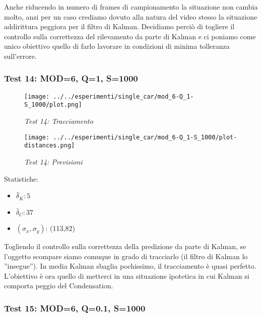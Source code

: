 Anche riducendo in numero di frames di campionamento la situazione non cambia molto, anzi per un caso crediamo dovuto alla natura del video stesso la situazione addirittura peggiora per il filtro di Kalman.
Decidiamo perciò di togliere il controllo sulla correttezza del rilevamento da parte di Kalman e ci poniamo come unico obiettivo quello di farlo lavorare in condizioni di minima tolleranza sull'errore.

\newpage
\subsubsection{Test 14: MOD=6, Q=1, S=1000}

\begin{figure}[hb]
\centering
\texttt{[image: ../../esperimenti/single\_car/mod\_6-Q\_1-S\_1000/plot.png]}
\caption{\textit{Test 14: Tracciamento}}
\end{figure}

\begin{figure}[hb]
\centering
\texttt{[image: ../../esperimenti/single\_car/mod\_6-Q\_1-S\_1000/plot-distances.png]}
\caption{\textit{Test 14: Previsioni}}
\end{figure}

Statistiche:
\begin{itemize}
\item \begin{math} \bar \delta_K: 5 \end{math}
\item \begin{math} \bar \delta_C: 37 \end{math}
\item \begin{math}(\sigma_x,\sigma_y)\end{math}: (113,82)
\end{itemize}

Togliendo il controllo sulla correttezza della predizione da parte di Kalman, se l'oggetto scompare siamo comuque in grado di tracciarlo (il filtro di Kalman lo ''insegue''). In media Kalman sbaglia pochissimo, il tracciamento è quasi perfetto.
L'obiettivo è ora quello di metterci in una situazione ipotetica in cui Kalman si comporta peggio del Condensation.

\newpage
\subsubsection{Test 15: MOD=6, Q=0.1, S=1000}

